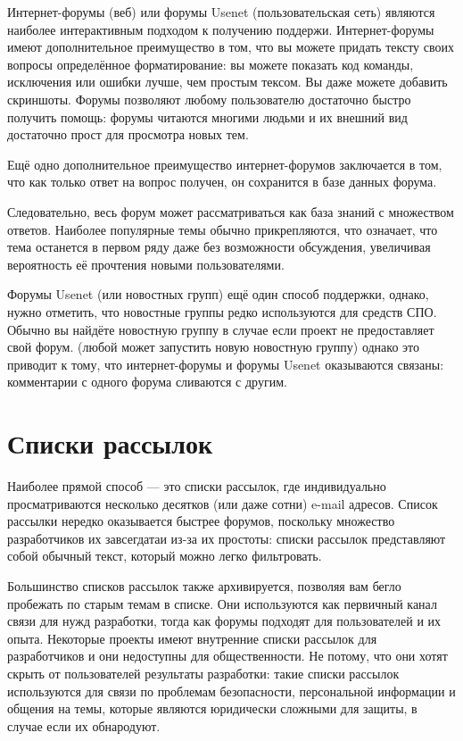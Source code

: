 \documentclass[12pt]{book}
\begin{document}
Интернет-форумы (веб) или форумы Usenet (пользовательская сеть) являются наиболее интерактивным подходом к получению поддержи. Интернет-форумы имеют дополнительное преимущество в том, что вы можете придать тексту своих вопросы определённое форматирование: вы можете показать код команды, исключения или ошибки лучше, чем простым тексом. Вы даже можете добавить скриншоты. Форумы позволяют любому пользователю достаточно быстро получить помощь: форумы читаются многими людьми и их внешний вид достаточно прост для просмотра новых тем. 

Ещё одно дополнительное преимущество интернет-форумов заключается в том, что как только ответ на вопрос получен, он сохранится в базе данных форума.

Следовательно, весь форум может рассматриваться как база знаний с множеством ответов. Наиболее популярные темы обычно прикрепляются, что означает, что тема останется в первом ряду даже без возможности обсуждения, увеличивая вероятность её прочтения новыми пользователями.

Форумы Usenet (или новостных групп) ещё один способ поддержки, однако, нужно отметить, что новостные группы редко используются для средств СПО. Обычно вы найдёте новостную группу в случае если проект не предоставляет свой форум. (любой может запустить новую новостную группу) однако это приводит к тому, что интернет-форумы и форумы Usenet оказываются связаны: комментарии с одного форума сливаются с другим.

\section{Списки рассылок}

Наиболее прямой способ — это списки рассылок, где индивидуально просматриваются несколько десятков (или даже сотни) e-mail адресов. Список рассылки нередко оказывается быстрее форумов, поскольку множество разработчиков их завсегдатаи из-за их простоты: списки рассылок представляют собой обычный текст, который можно легко фильтровать.

Большинство списков рассылок также архивируется, позволяя вам бегло пробежать по старым темам в списке. Они используются как первичный канал связи для нужд разработки, тогда как форумы подходят для пользователей и их опыта. Некоторые проекты имеют внутренние списки рассылок для разработчиков и они недоступны для общественности. Не потому, что они хотят скрыть от пользователей результаты разработки: такие списки рассылок используются для связи по проблемам безопасности, персональной информации и общения на темы, которые являются юридически сложными для защиты, в случае если их обнародуют.
\end{document}
